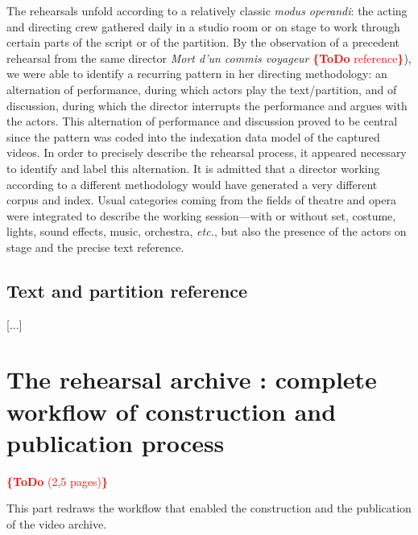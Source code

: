 \documentclass[conference]{IEEEtran}
\newcommand{\todo}[1]{\noindent\textcolor{red}{{\bf \{ToDo} #1{\bf \}}}}
\begin{document}
The rehearsals unfold according to a relatively classic \emph{modus operandi}: the acting and directing crew gathered daily in a studio room or on stage to work through certain parts of the script or of the partition. By the observation of a precedent rehearsal from the same director \emph{Mort d'un commis voyageur} \todo{reference}), we were able to identify a recurring pattern in her directing methodology: an alternation of performance, during which actors play the text/partition, and of discussion, during which the director interrupts the performance and argues with the actors. This alternation of performance and discussion proved to be central since the pattern was coded into the indexation data model of the captured videos.
In order to precisely describe the rehearsal process, it appeared necessary to identify and label this alternation.
It is admitted that a director working according to a different methodology would have generated a very different corpus and index.
Usual categories coming from the fields of theatre and opera were integrated to describe the working session---with or without set, costume, lights, sound effects, music, orchestra, \emph{etc.}, but also the presence of the actors on stage and the precise text reference.

\subsection{Text and partition reference}
[...]



\section{The rehearsal archive : complete workflow of construction and publication process}
\todo{(2,5 pages)}

This part redraws the workflow that enabled the construction and the publication of the video archive.
\end{document}
